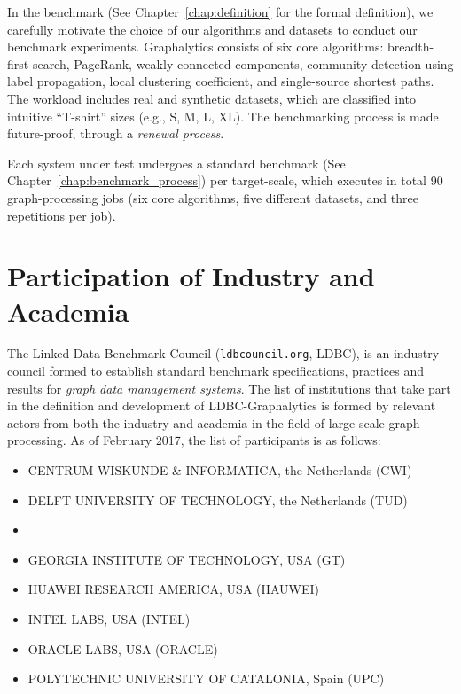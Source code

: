 In the benchmark (See Chapter~\ref{chap:definition} for the formal definition), we carefully motivate the choice of our algorithms and datasets to conduct our benchmark experiments. Graphalytics consists of six core algorithms: breadth-first search, PageRank, weakly connected components, community detection using label propagation, local clustering coefficient, and single-source shortest paths. The workload includes real and synthetic datasets, which are classified into intuitive ``T-shirt'' sizes (e.g., S, M, L, XL). The benchmarking process is made future-proof, through a {\it renewal process}. 

Each system under test undergoes a standard benchmark (See Chapter~\ref{chap:benchmark_process}) per target-scale, which executes in total 90 graph-processing jobs (six core algorithms, five different datasets, and three repetitions per job).


\section{Participation of Industry and Academia}
The Linked Data Benchmark Council ({\footnotesize\tt ldbcouncil.org}, LDBC), is an industry council formed to 
establish standard benchmark specifications, practices and results for {\em graph data management systems}. The list of institutions that take part in the definition and development of LDBC-Graphalytics is formed by relevant actors from both the industry and academia in the field of large-scale graph processing. As of February 2017, the list of participants is as follows:

\begin{itemize}
	\item \MakeUppercase{Centrum Wiskunde \& Informatica}, the Netherlands (CWI)
	\item \MakeUppercase{Delft University of Technology}, the Netherlands (TUD)
	\item {}
	\item \MakeUppercase{Georgia Institute of Technology}, USA (GT)
	\item \MakeUppercase{Huawei Research America}, USA (HAUWEI)
	\item \MakeUppercase{Intel Labs}, USA (INTEL)
	\item \MakeUppercase{Oracle Labs}, USA (ORACLE)
	\item \MakeUppercase{Polytechnic University of Catalonia}, Spain (UPC)
\end{itemize}
